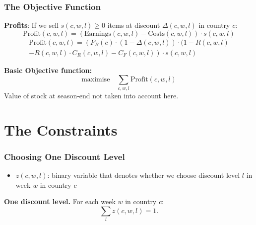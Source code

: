 \documentclass[xcolor=table]{beamer}
\begin{document}
\begin{frame}[t]
\frametitle{The Objective Function}
\textcolor{orange2}{\textbf{Profits}}: If we sell $s(c, w, l) \geq 0$ items at 
discount $\Delta(c, w, l)$ in country $c$:
\[
  \text{Profit}(c, w, l) = (\text{Earnings}(c, w, l) - \text{Costs}(c, w, l))
  \cdot s(c, w, l)
\]
\begin{multline*}
  \text{Profit}(c, w, l) =  \left ( P_B(c) \cdot (1 - \Delta(c, w, l)) \cdot (1 - R(c, w, l) \right . \\ 
                    - \left . R(c, w, l) \cdot C_R(c, w, l)  - C_F(c, w, l)
                    \right ) \cdot s(c, w, l)
\end{multline*}

\bigskip

\pause

\textcolor{orange2}{\textbf{Basic Objective function:}} 
\begin{equation*}  
  \text{maximise} \quad \sum_{c, w, l} \text{Profit}(c, w, l)
\end{equation*}
Value of stock at season-end not taken into account here.
\end{frame}

\section{The Constraints}

\begin{frame}[t]
\frametitle{Choosing One Discount Level}
  \begin{itemize}
    \item $z(c, w, l)$: binary variable that denotes whether we choose discount
      level $l$ in week $w$ in country $c$
    \end{itemize}

    \bigskip

\textcolor{orange2}{\textbf{One discount level.}} For each week $w$ in country
$c$:
    \begin{equation*}
      \sum_{l} z(c, w, l) = 1.
    \end{equation*}
\end{frame}
\end{document}
